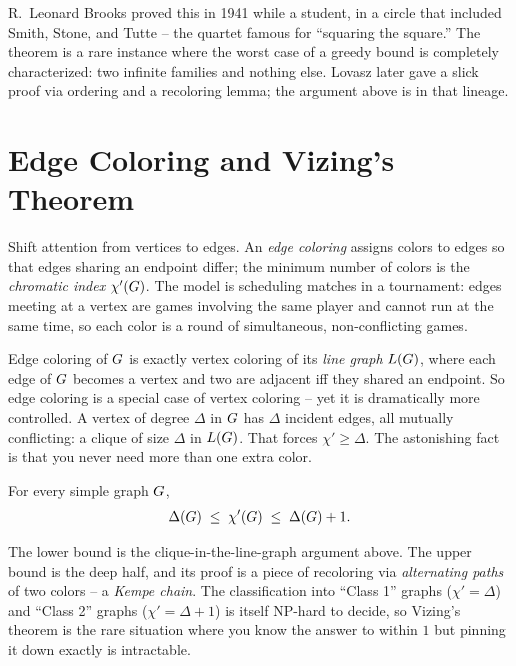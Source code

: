 \begin{historybox}
R.~Leonard Brooks proved this in 1941 while a student, in a circle that included
Smith, Stone, and Tutte -- the quartet famous for ``squaring the square.'' The
theorem is a rare instance where the worst case of a greedy bound is completely
characterized: two infinite families and nothing else. Lovasz later gave a slick
proof via ordering and a recoloring lemma; the argument above is in that lineage.
\end{historybox}

\section{Edge Coloring and Vizing's Theorem}
\label{ch28:vizing}

Shift attention from vertices to edges. An \emph{edge coloring} assigns colors to
edges so that edges sharing an endpoint differ; the minimum number of colors is the
\emph{chromatic index} $\chi'(G)$. The model is scheduling matches in a
tournament: edges meeting at a vertex are games involving the same player and
cannot run at the same time, so each color is a round of simultaneous,
non-conflicting games.

\begin{intuitionbox}
Edge coloring of $G$ is exactly vertex coloring of its \emph{line graph}
$L(G)$, where each edge of $G$ becomes a vertex and two are adjacent iff they
shared an endpoint. So edge coloring is a special case of vertex coloring -- yet it
is dramatically more controlled. A vertex of degree $\Delta$ in $G$ has $\Delta$
incident edges, all mutually conflicting: a clique of size $\Delta$ in $L(G)$.
That forces $\chi'\ge\Delta$. The astonishing fact is that you never need more than
one extra color.
\end{intuitionbox}

\begin{theorem}[Vizing, 1964]
\label{ch28:thm-vizing}
For every simple graph $G$,
\[
  \Delta(G) \;\le\; \chi'(G) \;\le\; \Delta(G)+1 .
\]
\end{theorem}

The lower bound is the clique-in-the-line-graph argument above. The upper bound is
the deep half, and its proof is a piece of recoloring via \emph{alternating paths}
of two colors -- a \emph{Kempe chain}. The classification into ``Class 1'' graphs
($\chi'=\Delta$) and ``Class 2'' graphs ($\chi'=\Delta+1$) is itself NP-hard to
decide, so Vizing's theorem is the rare situation where you know the answer to
within $1$ but pinning it down exactly is intractable.

